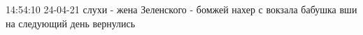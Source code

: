  
 
 
 
 

14:54:10 24-04-21
слухи - жена Зеленского - бомжей нахер с вокзала бабушка
вши на следующий день вернулись
